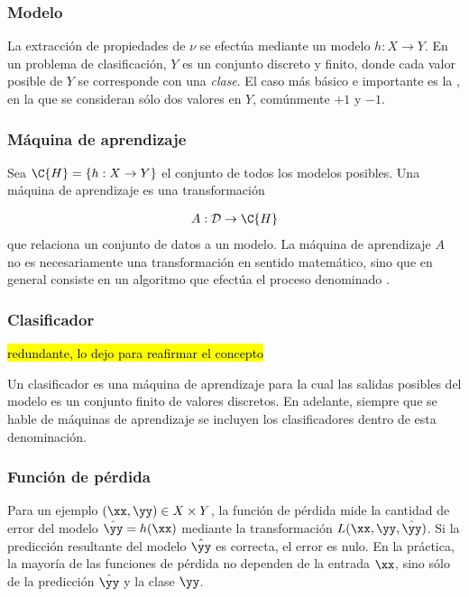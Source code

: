 \subsubsection{Modelo}
La extracción de propiedades de $\nu$ se efectúa mediante un modelo
$h:X\rightarrow{}Y$. En un problema de clasificación, $Y$ es un
conjunto discreto y finito, donde cada valor posible de $Y$ se
corresponde con una \emph{clase}. El caso más básico e importante es
la , en la que se consideran sólo dos valores
en $Y$, comúnmente $+1$ y $-1$.

\subsubsection{Máquina de aprendizaje}
Sea $\C{H}=\{h:X\rightarrow Y\}$ el conjunto de todos los modelos
posibles. Una máquina de aprendizaje es una transformación

\begin{align}
  A:\mathcal{D}\rightarrow\C{H}
  \label{eq:maqaprendizaje}
\end{align}
que relaciona un conjunto de datos a un modelo.
La máquina de aprendizaje $A$ no es necesariamente una transformación
en sentido matemático, sino que en general consiste en un algoritmo
que efectúa el proceso denominado .

\subsubsection{Clasificador}
\hl{redundante, lo dejo para reafirmar el concepto}

Un clasificador es una máquina de aprendizaje para la cual las salidas
posibles del modelo es un conjunto finito de valores discretos.  En
adelante, siempre que se hable de máquinas de aprendizaje se incluyen
los clasificadores dentro de esta denominación.

\subsubsection{Función de pérdida}
Para un ejemplo $(\xx,\yy)\in{}X\times{}Y$, la función de pérdida mide
la cantidad de error del modelo $\hat{\yy}=h(\xx)$ mediante la
transformación $L(\xx,\yy,\hat{\yy})$.  Si la predicción resultante
del modelo $\hat{\yy}$ es correcta, el error es nulo. En la práctica,
la mayoría de las funciones de pérdida no dependen de la entrada
$\xx$, sino sólo de la predicción $\hat{\yy}$ y la clase $\yy$.

